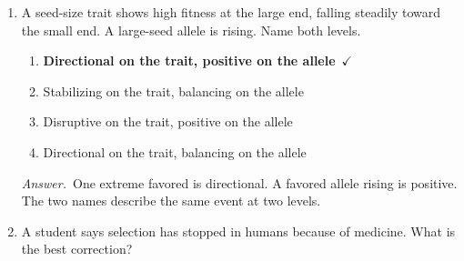 \documentclass[11pt]{article}
\newcommand{\keyans}[1]{\par\medskip\noindent\textit{Answer.}\ #1\par\medskip}
\begin{document}
\begin{enumerate}[label=\textbf{\arabic*.}, leftmargin=2em, itemsep=1.4em]
\begin{enumerate}[label={}, leftmargin=2.4em, labelwidth=0pt, itemsep=2pt, topsep=0pt]
\item \hspace*{-2.4em}Relative fitnesses only
\item \hspace*{-2.4em}\textbf{Hardy-Weinberg genotype frequencies}\ \(\checkmark\)
\item \hspace*{-2.4em}Heterozygote advantage
\item \hspace*{-2.4em}Complete dominance
\end{enumerate}
\keyans{``All single-locus cases'' means any fitness pattern at one gene. The derivation still assumes an allele's partner is drawn at random, with probabilities \(q\) and \(p\).}
\item A seed-size trait shows high fitness at the large end, falling steadily toward the small end. A large-seed allele is rising. Name both levels.
\nopagebreak\par{}
\par\smallskip
\begin{enumerate}[label={}, leftmargin=2.4em, labelwidth=0pt, itemsep=2pt, topsep=0pt]
\item \hspace*{-2.4em}\textbf{Directional on the trait, positive on the allele}\ \(\checkmark\)
\item \hspace*{-2.4em}Stabilizing on the trait, balancing on the allele
\item \hspace*{-2.4em}Disruptive on the trait, positive on the allele
\item \hspace*{-2.4em}Directional on the trait, balancing on the allele
\end{enumerate}
\keyans{One extreme favored is directional. A favored allele rising is positive. The two names describe the same event at two levels.}
\item A student says selection has stopped in humans because of medicine. What is the best correction?
\nopagebreak\par{}
\par\smallskip

\end{enumerate}
\end{document}
